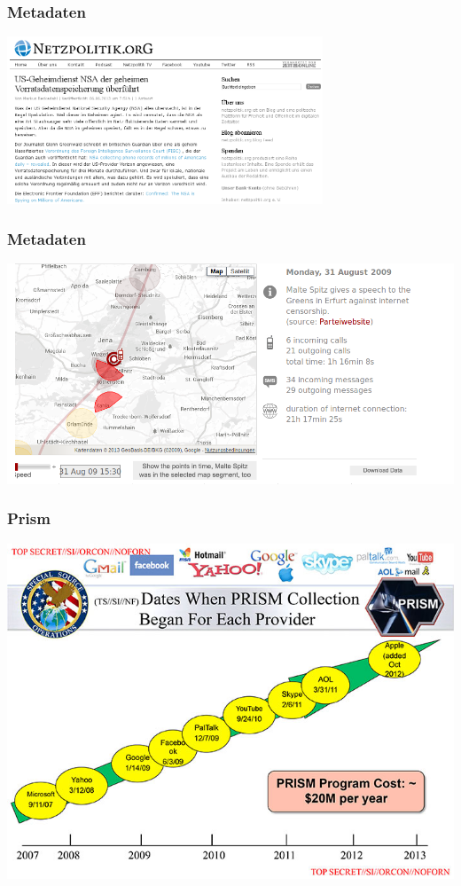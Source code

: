 \documentclass[12pt]{beamer}
\begin{document}
\begin{frame}
  \frametitle{Metadaten}
    \begin{center}
      \includegraphics[height=5cm]{img/netzpolitik-verizon.png}
    \end{center}
\end{frame}

\begin{frame}
    \frametitle{Metadaten}
    \includegraphics[height=0.7\textheight]{img/maltespitz.png}
\end{frame}

\begin{frame}
    \frametitle{Prism}
    \includegraphics[height=0.7\textheight]{img/prism.jpg}
\end{frame}
\end{document}
